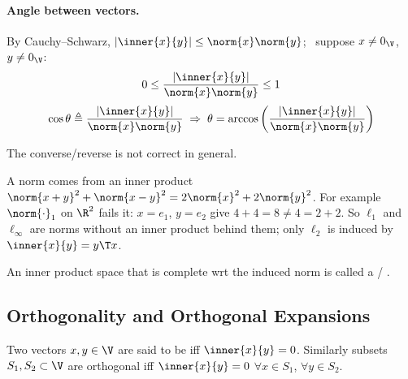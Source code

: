 \paragraph{Angle between vectors.} By Cauchy--Schwarz, $|\inner{x}{y}| \le \norm{x}\norm{y}$; \ suppose $x\neq 0_{\V}$, $y\neq 0_{\V}$:
\[
0 \le \frac{|\inner{x}{y}|}{\norm{x}\norm{y}} \le 1
\]
\[
\cos\theta \triangleq \frac{|\inner{x}{y}|}{\norm{x}\norm{y}} \;\Rightarrow\; \theta = \arccos\left(\frac{|\inner{x}{y}|}{\norm{x}\norm{y}}\right)
\]
\begin{remark}
 The converse/reverse is not correct in general.
\end{remark}
\begin{insight}
A norm comes from an inner product 
$\norm{x+y}^2 + \norm{x-y}^2 = 2\norm{x}^2 + 2\norm{y}^2$.
For example $\norm{\cdot}_1$ on $\R^2$ fails it: $x = e_1$, $y = e_2$ give $4+4 = 8 \neq 4 = 2+2$. So $\ell_1$ and $\ell_\infty$ are norms without an inner product behind them; only $\ell_2$ is induced by $\inner{x}{y} = y\T x$.
\end{insight}
\begin{definition}
An inner product space that is complete wrt the induced norm is called a  / .
\end{definition}
\subsection{Orthogonality and Orthogonal Expansions}\label{ss:orthogonality}
\begin{definition}
Two vectors $x,y\in\V$ are said to be  iff $\inner{x}{y} = 0$.
Similarly subsets $S_1, S_2\subset\V$ are orthogonal iff $\inner{x}{y} = 0$ $\forall x\in S_1$, $\forall y\in S_2$.
\end{definition}
